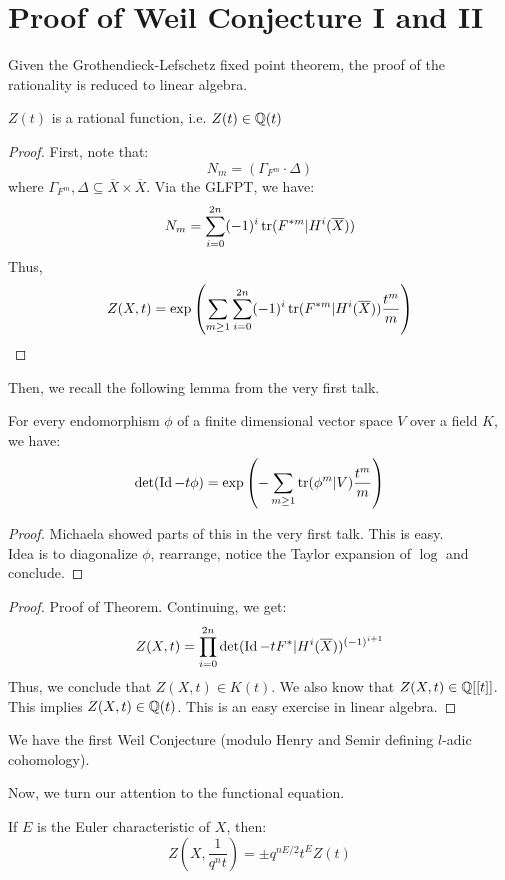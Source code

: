 \documentclass[12pt]{amsart}
\begin{document}
\newpage

\section{Proof of Weil Conjecture I and II}


Given the Grothendieck-Lefschetz fixed point theorem, the proof of the rationality is reduced to linear algebra. 

\begin{theorem}
    $Z(t)$ is a rational function, i.e. $Z(t) \in \mathbb Q(t)$
\end{theorem}

\begin{proof}
    First, note that:
    \[ N_m = (\Gamma_{F^m} \cdot \Delta)\]
    where $\Gamma_{F^m}, \Delta \subseteq \overline{X} \times \overline{X}$.
    Via the GLFPT, we have:
    \[ N_m = \sum_{i = 0}^{2n} (-1)^i \operatorname{tr}(F^{*m}|H^i(\overline{X})) \]
    Thus, 
    \[ Z(X, t) = \exp\left(\sum_{m \geq 1} \sum_{i=0}^{2n} (-1)^i \operatorname{tr}(F^{*m} | H^i(\overline{X})) \frac{t^m}{m}\right)\]
\end{proof}

Then, we recall the following lemma from the very first talk. 
\begin{lemma}
    For every endomorphism $\phi$ of a finite dimensional vector space $V$ over a field $K$, we have:
    \[ \det(\operatorname{Id} - t\phi) = \exp\left(-\sum_{m\geq 1} \operatorname{tr}(\phi^m | V) \frac{t^m}{m}\right)\]
\end{lemma}
\begin{proof}
    Michaela showed parts of this in the very first talk. This is easy. \\
    Idea is to diagonalize $\phi$, rearrange, notice the Taylor expansion of $\log$ and conclude.  
\end{proof}

\begin{proof}{Proof of Theorem.}
    Continuing, we get: 
    \[  Z(X, t) = \prod_{i=0}^{2n} \det(\operatorname{Id} - tF^*| H^i(\overline{X}))^{(-1)^{i+1}}\]
    Thus, we conclude that $Z(X, t) \in K(t)$. We also know that $Z(X, t) \in \mathbb Q[[t]]$. \\
    This implies $Z(X, t) \in \mathbb Q(t)$. This is an easy exercise in linear algebra.
\end{proof}

We have the first Weil Conjecture (modulo Henry and Semir defining $l$-adic cohomology). \bbni
\newpage 

Now, we turn our attention to the functional equation. 
\begin{theorem}
    If $E$ is the Euler characteristic of $X$, then:
    \[ Z\left(X, \frac{1}{q^nt}\right) = \pm q^{nE/2}t^E Z(t) \]
\end{theorem}
\end{document}
